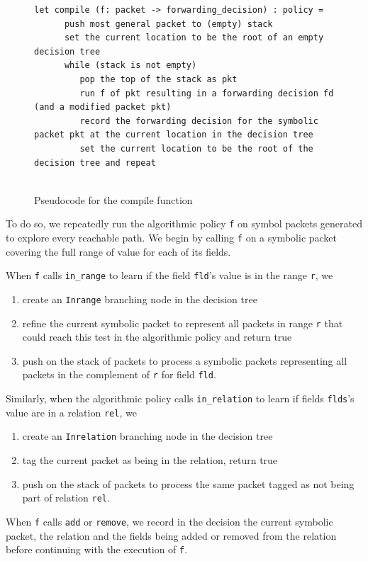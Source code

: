 \documentclass[preprint]{sigplanconf}
\begin{document}
\begin{figure}[ht]
\begin{lstlisting}
let compile (f: packet -> forwarding_decision) : policy =
      push most general packet to (empty) stack
      set the current location to be the root of an empty decision tree
      while (stack is not empty)
         pop the top of the stack as pkt
         run f of pkt resulting in a forwarding decision fd (and a modified packet pkt)
         record the forwarding decision for the symbolic packet pkt at the current location in the decision tree
         set the current location to be the root of the decision tree and repeat
  
\end{lstlisting}
\caption{Pseudocode for the compile function}
\label{fig:compile-pseudo}
\end{figure}

To do so, we repeatedly run the algorithmic policy \lstinline|f| on symbol packets generated to explore every reachable path.
We begin by calling \lstinline|f| on a symbolic packet covering the full range of value for each of its fields.

When \lstinline|f| calls \lstinline|in_range| to learn if the field \lstinline|fld|'s value is in the range \lstinline|r|, we
\begin{enumerate}
\item  create an \lstinline|Inrange| branching node in the decision tree
\item refine the current symbolic packet to represent all packets in range \lstinline|r| that could reach this test in the algorithmic policy and return true
\item push on the stack of packets to process a symbolic packets representing all packets in the complement of \lstinline|r| for field \lstinline|fld|.
\end{enumerate}


Similarly, when the algorithmic policy calls \lstinline|in_relation| to learn if fields \lstinline|flds|'s value are in a relation \lstinline|rel|, we
\begin{enumerate}
  \item create an \lstinline|Inrelation| branching node in the decision tree
  \item tag the current packet as being in the relation, return true
  \item push on the stack of packets to process the same packet tagged as not being part of relation \lstinline|rel|.
\end{enumerate}
When \lstinline|f| calls \lstinline|add| or \lstinline|remove|, we record in the decision the current symbolic packet, the relation and the fields being added or removed from the relation before continuing with the execution of \lstinline|f|.
\end{document}
